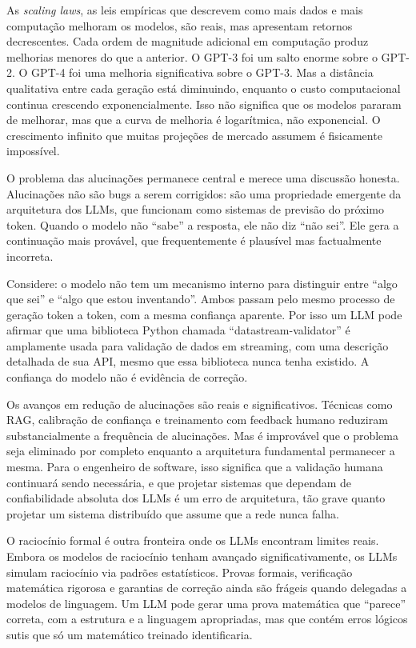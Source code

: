 As \textit{scaling laws}, as leis empíricas que descrevem como mais
dados e mais computação melhoram os modelos, são reais, mas
apresentam retornos decrescentes. Cada ordem de magnitude adicional em
computação produz melhorias menores do que a anterior. O GPT-3 foi
um salto enorme sobre o GPT-2. O GPT-4 foi uma melhoria significativa
sobre o GPT-3. Mas a distância qualitativa entre cada geração está
diminuindo, enquanto o custo computacional continua crescendo
exponencialmente. Isso não significa que os modelos pararam de melhorar,
mas que a curva de melhoria é logarítmica, não exponencial. O
crescimento infinito que muitas projeções de mercado assumem é
fisicamente impossível.

O problema das alucinações permanece central e merece uma discussão
honesta. Alucinações não são bugs a serem corrigidos: são uma
propriedade emergente da arquitetura dos LLMs, que funcionam como
sistemas de previsão do próximo token. Quando o modelo
não ``sabe'' a resposta, ele não diz ``não sei''. Ele gera a
continuação mais provável, que frequentemente é plausível mas
factualmente incorreta.

Considere: o modelo não tem um mecanismo interno para distinguir entre
``algo que sei'' e ``algo que estou inventando''. Ambos passam pelo
mesmo processo de geração token a token, com a mesma confiança
aparente. Por isso um LLM pode afirmar que uma biblioteca
Python chamada ``datastream-validator'' é amplamente usada para
validação de dados em streaming, com uma descrição detalhada de
sua API, mesmo que essa biblioteca nunca tenha existido. A confiança
do modelo não é evidência de correção.

Os avanços em redução de alucinações são reais e significativos.
Técnicas como RAG, calibração de confiança e treinamento com feedback
humano reduziram substancialmente a frequência de alucinações. Mas é
improvável que o problema seja eliminado por completo enquanto a
arquitetura fundamental permanecer a mesma. Para o engenheiro de
software, isso significa que a validação humana continuará sendo
necessária, e que projetar sistemas que dependam de confiabilidade
absoluta dos LLMs é um erro de arquitetura, tão grave quanto
projetar um sistema distribuído que assume que a rede nunca falha.

O raciocínio formal é outra fronteira onde os LLMs encontram limites
reais. Embora os modelos de raciocínio tenham avançado
significativamente, os LLMs simulam raciocínio via
padrões estatísticos. Provas formais, verificação matemática rigorosa
e garantias de correção ainda são frágeis quando delegadas a modelos de
linguagem. Um LLM pode gerar uma prova matemática que ``parece''
correta, com a estrutura e a linguagem apropriadas, mas que contém
erros lógicos sutis que só um matemático treinado identificaria.

